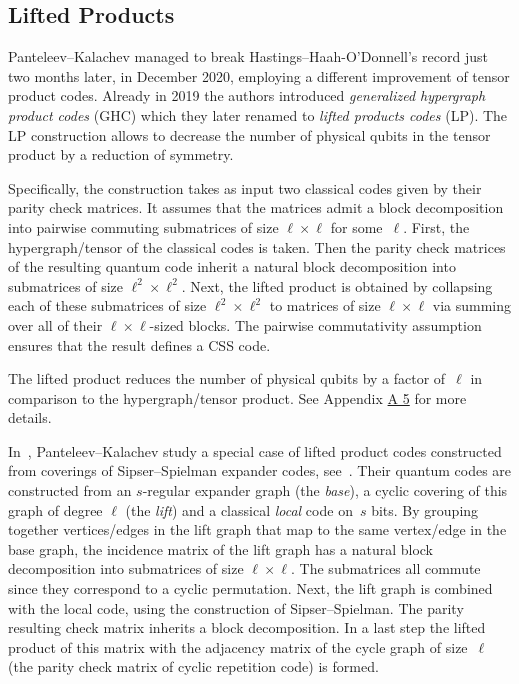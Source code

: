 \documentclass[amsmath, amssymb, floatfix, reprint, twocolumn, notitlepage, 10pt]{revtex4-1}
\newcommand{\change}{}
\begin{document}
\subsection{Lifted Products}\label{sec:lifted_product}
Panteleev--Kalachev \cite{panteleev2020quantum} managed to break Hastings--Haah-O'Donnell's record just two months later, in December 2020, employing  a different improvement of tensor product codes.
Already in 2019 \cite{panteleev2019degenerate} the authors introduced \emph{generalized hypergraph product codes} (GHC) which they later renamed to \emph{lifted products codes} (LP). 
The LP construction allows to decrease the number of physical qubits in the tensor product by a reduction of symmetry. 

{\change Specifically, the construction takes as input two classical codes given by their parity check matrices. It assumes that the matrices admit a block decomposition into pairwise commuting submatrices of size $\ell \times \ell$ for some~$\ell$.
First, the hypergraph/tensor of the classical codes is taken. Then the parity check matrices of the resulting quantum code inherit a natural block decomposition into submatrices of size $\ell^2 \times \ell^2$. 
Next, the lifted product is obtained by collapsing each of these submatrices of size $\ell^2 \times \ell^2$ to matrices of size $\ell\times\ell$ via summing over all of their $\ell\times\ell$-sized blocks. 
The pairwise commutativity assumption ensures that the result defines a CSS code. 

The lifted product reduces the number of physical qubits by a factor of~$\ell$ in comparison to the hypergraph/tensor product. See Appendix \hyperref[app:liftedproducts]{A 5} for more details.

In~\cite{panteleev2020quantum}, Panteleev--Kalachev study a special case of lifted product codes constructed from coverings of Sipser--Spielman expander codes, see~\cite{sipser_expander_1996}. 
Their quantum codes are constructed from an $s$-regular expander graph (the \emph{base}), a cyclic covering of this graph of degree $\ell$ (the \emph{lift}) and a classical \emph{local} code on~$s$ bits. By grouping together vertices/edges in the lift graph that map to the same vertex/edge in the base graph, the incidence matrix of the lift graph has a natural block decomposition into submatrices of size $\ell\times\ell.$ The submatrices all commute since they correspond to a cyclic permutation. Next, the lift graph is combined with the local code, using the construction of Sipser--Spielman. The parity resulting check matrix inherits a block decomposition. In a last step the lifted product of this matrix with the adjacency matrix of the cycle graph of size~$\ell$ (the parity check matrix of cyclic repetition code) is formed.}
\end{document}
